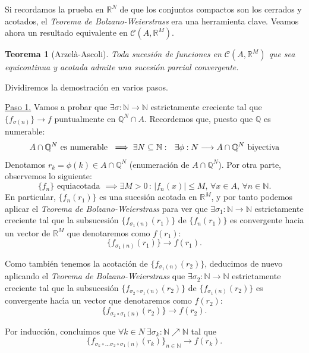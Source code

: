 \documentclass[11pt, a4paper]{article}
\makeatletter
\newif\IfInSansMode
\let\oldsf\sffamily
\renewcommand*{\sffamily}{\oldsf\mathversion{sans}\InSansModetrue}
\let\oldnorm\normalfont
\renewcommand*{\normalfont}{\oldnorm\InSansModefalse\mathversion{normal}}
\renewenvironment{proof}[1][\proofname] {\par\pushQED{\qed}\normalfont\topsep6\p@\@plus6\p@\relax\trivlist\item[\hskip\labelsep\itshape\sffamily#1\@addpunct{.}]\ignorespaces}{\popQED\endtrivlist\@endpefalse}
\theoremstyle{theorem-style}
\newtheorem{nth}{Teorema}[section]
\theoremstyle{definition-style}
\theoremstyle{remark-style}
\theoremstyle{example-style}
\makeatother
\begin{document}
Si recordamos la prueba en $\mathbb{R}^N$ de que los conjuntos compactos son los cerrados y acotados, el \textit{Teorema de Bolzano-Weierstrass} era una herramienta clave. Veamos ahora un resultado equivalente en $\mathcal{C}(A,\mathbb{R}^M)$.

\begin{nth}[Arzelà-Ascoli] \label{6} Toda sucesión de funciones en $\mathcal{C}(A,\mathbb{R}^M)$ que sea equicontinua y acotada admite una sucesión parcial convergente.
\end{nth}

\begin{proof} Dividiremos la demostración en varios pasos.

    \underline{Paso 1.} Vamos a probar que $\exists \sigma : \mathbb{N} \to \mathbb{N}$ estrictamente creciente tal que $\{f_{\sigma(n)}\} \to f$ puntualmente en $\mathbb{Q}^N\cap A$.
    Recordemos que, puesto que $\mathbb Q$ es numerable:
    \[
      A\cap \mathbb Q^N \mbox{ es numerable } \implies \exists N\subseteq \mathbb{N}: \ \
      \exists \phi :N \longrightarrow  A\cap \mathbb Q^N  \mbox{ biyectiva}
    \]
    Denotamos $r_k=\phi(k) \in  A\cap \mathbb Q^N $ (enumeraci\'on de $A\cap \mathbb Q^N $). Por otra parte, observemos lo siguiente:
    \[
      \{f_n \} \mbox{ equiacotada } \implies \exists M>0 \, : \, |f_n(x) |\leq M , \, \forall x\in A , \, \forall n\in \mathbb N.
    \]
    En particular, $\{ f_n (r_1)\}$ es una sucesi\'on acotada en $\mathbb R^M$, y por tanto podemos aplicar el \textit{Teorema de Bolzano-Weierstrass} para ver que $\exists \sigma_1:\mathbb N \longrightarrow \mathbb N$ estrictamente creciente tal que la subsucesión $\{ f_{\sigma_1 (n)} (r_1) \}$ de $\{ f_{n} (r_1) \}$ es convergente hacia un vector de  $\mathbb R^M$  que denotaremos como $f(r_1)$:
    \[
      \{ f_{\sigma_1 (n)} (r_1) \} \longrightarrow f(r_1).
    \]

    Como también tenemos la acotaci\'on de $\{ f_{\sigma_1 (n)} (r_2) \} $, deducimos de nuevo aplicando el \textit{Teorema de Bolzano-Weierstrass} que $\exists \sigma_2:\mathbb N \longrightarrow \mathbb N$ estrictamente creciente tal que la subsucesión $\{ f_{\sigma_2 \circ\sigma_1 (n)} (r_2) \}$ de $\{ f_{\sigma_1 (n)} (r_2) \}$ es convergente hac\'{\i}a un vector que denotaremos como $f(r_2)$:
    \[
      \{ f_{\sigma_2 \circ \sigma_1 (n)} (r_2) \} \longrightarrow f(r_2).
    \]

    Por inducci\'on, concluimos que
    $
    \forall k\in N \ \exists \sigma_k :\mathbb N \nearrow  \mathbb N   
    $ tal que
    \[
      \{ f_{\sigma_k \circ \dots \sigma_2 \circ\sigma_1 (n)} (r_k) \}_{n\in\mathbb N}  \longrightarrow f(r_k).
    \]


\end{proof}
\end{document}
